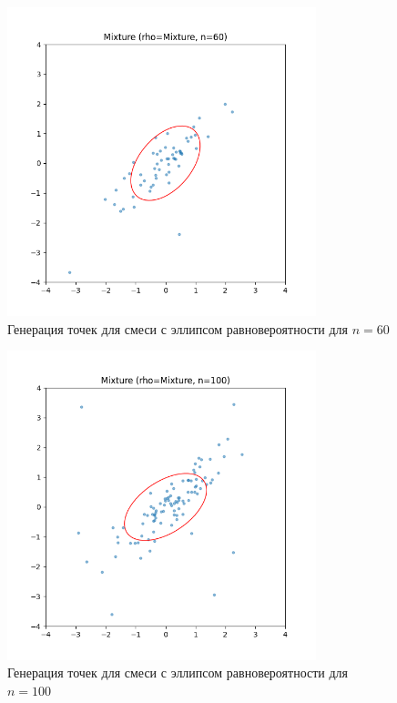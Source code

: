 \documentclass[a4paper]{article}
\begin{document}
    \begin{figure}[H]
        \centering
        \includegraphics[width=0.8\textwidth]{./plots/mixture_rhoMixture_n60}
        \caption{Генерация точек для смеси с эллипсом равновероятности для $n=60$}
        \label{fig:mixture_rhoMixture_n60}
    \end{figure}

    \begin{figure}[H]
        \centering
        \includegraphics[width=0.8\textwidth]{./plots/mixture_rhoMixture_n100}
        \caption{Генерация точек для смеси с эллипсом равновероятности для $n=100$}
        \label{fig:mixture_rhoMixture_n100}
    \end{figure}
\end{document}
